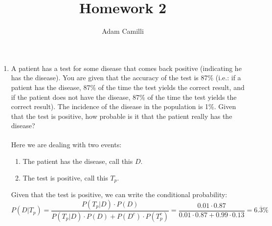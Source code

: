 \documentclass[12pt]{article}
\begin{document}
\title{Homework 2}
\maketitle
\author{Adam Camilli}
\begin{enumerate}
\item A patient has a test for some disease that comes back positive (indicating he has the disease).  You are given that the accuracy of the test is 87\% (i.e.: if a patient has the disease, 87\% of the time the test yields the correct result, and if the patient does not have the disease, 87\% of the time the test yields the correct result). The incidence of the disease in the population is 1\%. Given that the test is positive, how probable is it that the patient really has the disease? 
\\ \\
Here we are dealing with two events:
\begin{enumerate}
  \item The patient has the disease, call this $D$.
  \item The test is positive, call this $T_p$.
  \end{enumerate}
Given that the test is positive, we can write the conditional probability:
\[ P(D | T_p) = \frac{P(T_p | D) \cdot P(D)}{ P(T_p | D) \cdot P(D) + P(D^c) \cdot P(T_p^c)  } = \frac{0.01 \cdot 0.87}{0.01 \cdot 0.87 + 0.99 \cdot 0.13} = 6.\overline{3}\% \]


\end{enumerate}
\end{document}
